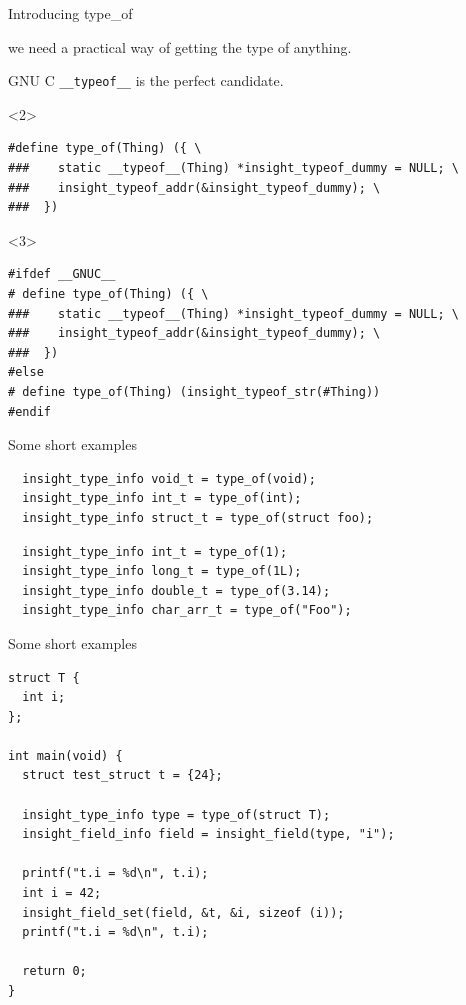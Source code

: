 \documentclass[10pt]{beamer}
\begin{document}
\begin{frame}[fragile]{Introducing type\_of}

  we need a practical way of getting the type of anything.

  \pause{}

  GNU C \verb|__typeof__| is the perfect candidate.

  \begin{onlyenv}<2>
  \small\begin{lstlisting}
#define type_of(Thing) ({ \
###    static __typeof__(Thing) *insight_typeof_dummy = NULL; \
###    insight_typeof_addr(&insight_typeof_dummy); \
###  })
  \end{lstlisting}\normalsize
  \end{onlyenv}

  \begin{onlyenv}<3>
  \small\begin{lstlisting}
#ifdef __GNUC__
# define type_of(Thing) ({ \
###    static __typeof__(Thing) *insight_typeof_dummy = NULL; \
###    insight_typeof_addr(&insight_typeof_dummy); \
###  })
#else
# define type_of(Thing) (insight_typeof_str(#Thing))
#endif
  \end{lstlisting}\normalsize
  \end{onlyenv}

\end{frame}

\begin{frame}[fragile]{Some short examples}
  \begin{lstlisting}
  insight_type_info void_t = type_of(void);
  insight_type_info int_t = type_of(int);
  insight_type_info struct_t = type_of(struct foo);
  \end{lstlisting}

  \pause{}

  \begin{lstlisting}
  insight_type_info int_t = type_of(1);
  insight_type_info long_t = type_of(1L);
  insight_type_info double_t = type_of(3.14);
  insight_type_info char_arr_t = type_of("Foo");
  \end{lstlisting}
\end{frame}

\begin{frame}[fragile]{Some short examples}

  \begin{lstlisting}
struct T {
  int i;
};

int main(void) {
  struct test_struct t = {24};

  insight_type_info type = type_of(struct T);
  insight_field_info field = insight_field(type, "i");

  printf("t.i = %d\n", t.i);
  int i = 42;
  insight_field_set(field, &t, &i, sizeof (i));
  printf("t.i = %d\n", t.i);

  return 0;
}
  \end{lstlisting}
\end{frame}
\end{document}
